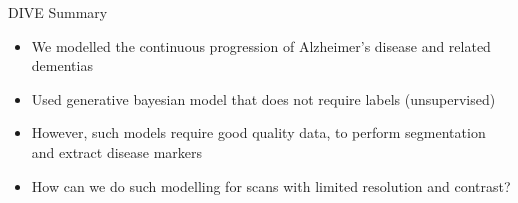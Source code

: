 \begin{frame}{DIVE Summary}

\begin{itemize}
 \item We modelled the continuous progression of Alzheimer's disease and related dementias
 
 \vo
 
 \item Used generative bayesian model that does not require labels (unsupervised)
 
 \vo
 
 \item However, such models require good quality data, to perform segmentation and extract disease markers
 
 \vo
 
 \item How can we do such modelling for scans with limited resolution and contrast?
\end{itemize}

 
\end{frame}


% 
% 
% 
% 
% 
% 


% 
% 
% 
% 
% 
% 
% 


